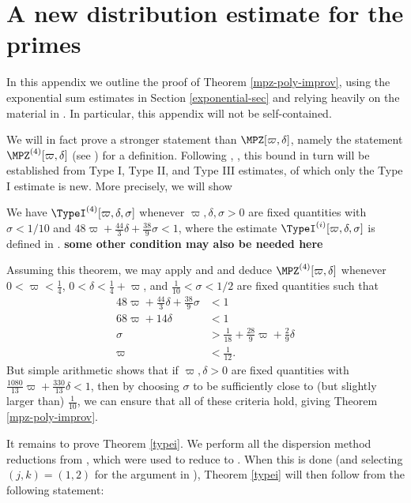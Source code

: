 \section{A new distribution estimate for the primes}\label{dist-app}

In this appendix we outline the proof of Theorem \ref{mpz-poly-improv}, using the exponential sum estimates in Section \ref{exponential-sec} and relying heavily on the material in \cite{polymath8a}.  In particular, this appendix will not be self-contained.

We will in fact prove a stronger statement than $\MPZ[\varpi,\delta]$, namely the statement $\MPZ^{(4)}[\varpi,\delta]$ (see \cite[Claim 2.5]{polymath8a}) for a definition.  Following \cite{zhang}, \cite{polymath8a}, this bound in turn will be established from Type I, Type II, and Type III estimates, of which only the Type I estimate is new.  More precisely, we will show

\begin{theorem}\label{typei} We have $\TypeI^{(4)}[\varpi,\delta,\sigma]$ whenever $\varpi,\delta,\sigma > 0$ are fixed quantities with $\sigma < 1/10$ and $48 \varpi+ \frac{44}{3}\delta + \frac{38}{9} \sigma < 1$, where the estimate $\TypeI^{(i)}[\varpi,\delta,\sigma]$ is defined in \cite[Definition 2.21]{polymath8a}. {\bf some other condition may also be needed here}
\end{theorem}

Assuming this theorem, we may apply \cite[Lemma 2.22]{polymath8a} and \cite[Theorem 2.23(iv),(v)]{polymath8a} and deduce $\MPZ^{(4)}[\varpi,\delta]$ whenever $0 < \varpi < \frac{1}{4}$, $0 < \delta < \frac{1}{4}+\varpi$, and $\frac{1}{10} < \sigma < 1/2$ are fixed quantities such that
\begin{align*}
48 \varpi+ \frac{44}{3}\delta + \frac{38}{9} \sigma &< 1 \\
68\varpi + 14 \delta &< 1 \\
\sigma &> \frac{1}{18} + \frac{28}{9} \varpi + \frac{2}{9} \delta \\
\varpi &< \frac{1}{12}.
\end{align*}
But simple arithmetic shows that if $\varpi,\delta > 0$ are fixed quantities with $\frac{1080}{13} \varpi + \frac{330}{13} \delta < 1$, then by choosing $\sigma$ to be sufficiently close to (but slightly larger than) $\frac{1}{10}$, we can ensure that all of these criteria hold, giving Theorem \ref{mpz-poly-improv}.

It remains to prove Theorem \ref{typei}.  We perform all the dispersion method reductions from \cite[\S 7]{polymath8a}, which were used to reduce \cite[Theorem 7.1]{polymath8a} to \cite[Theorem 7.8]{polymath8a}.  When this is done (and selecting $(j,k) = (1,2)$ for the argument in \cite[\S 7]{polymath8a}), Theorem \ref{typei} will then follow from the following statement:

